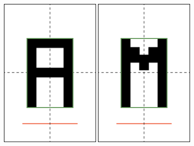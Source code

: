 \documentclass[letter, 11pt]{article}
\begin{document}
\begin{center}
  \includegraphics[height=20em]{A.png}
  \includegraphics[height=20em]{M.png}
\end{center}


\pagebreak
\end{document}
